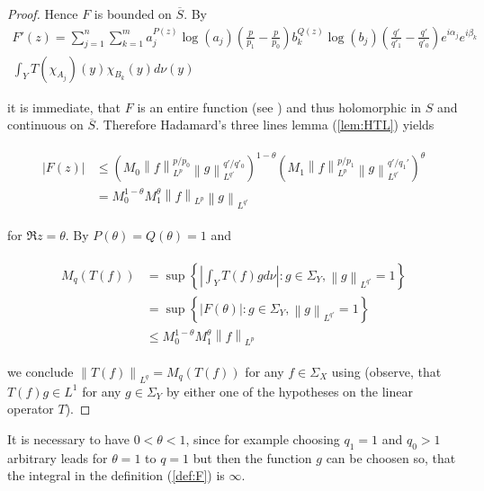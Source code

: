 \begin{proof}
	Hence $F$ is bounded on $\overline{S}$. By 
\begin{multline*}
	F'(z) = \sum_{j = 1}^n\sum_{k = 1}^m a^{P(z)}_j\log \left( a_j \right) \left( \frac{p}{p_1} - \frac{p}{p_0} \right) b_k^{Q(z)}\log\left( b_j \right)\left( \frac{q'}{q'_1} - \frac{q'}{q'_0} \right) e^{i\alpha_j} e^{i\beta_k} \\\int_YT(\chi_{A_j})(y)\chi_{B_k}(y)d\nu(y) 	
\end{multline*}

it is immediate, that $F$ is an entire function (see \cite[198]{rudin:rc_analysis:1987}) and thus holomorphic in $S$ and continuous on $\overline{S}$. Therefore Hadamard's three lines lemma (\ref{lem:HTL}) yields

\begin{gather}
	\begin{aligned}
		\left| F(z) \right| &\leqslant \left( M_0  \left\|f\right\|_{L^p}^{p/p_0} \left\|g\right\|_{L^{q'}}^{q'/q'_0} \right)^{1 - \theta}\left(  M_1 \left\|f\right\|_{L^p}^{p/p_1}\left\|g\right\|_{L^{q'}}^{q'/q_1'} \right)^\theta\\
			&= M_0^{1 - \theta}M_1^\theta \left\|f\right\|_{L^p}\left\|g\right\|_{L^{q'}}
		\label{est:F}
	\end{aligned}
\end{gather}

	for $\Re z = \theta$. By $P(\theta) = Q(\theta) = 1$ and

\begin{gather}
	\begin{aligned}
		M_q\left( T(f) \right) &= \sup\left\{\left| \int_Y T(f)gd\nu\right| : g \in \Sigma_Y, \left\|g\right\|_{L^{q'}} = 1\right\}\\
		&=  \sup\left\{\left| F(\theta)\right| : g \in \Sigma_Y, \left\|g\right\|_{L^{q'}} = 1\right\}\\
		&\leqslant M_0^{1 - \theta}M_1^\theta \left\|f\right\|_{L^p}
		\label{id:F}
	\end{aligned}
\end{gather}

	we conclude $\left\| T(f)\right\|_{L^q} = M_q\left( T(f) \right)$ for any $f \in \Sigma_X$ using \cite[189]{folland:real_analysis:1999} (observe, that $T(f)g \in L^1$ for any $g \in \Sigma_Y$ by either one of the hypotheses on the linear operator $T$).
\end{proof}

\begin{remark}
	It is necessary to have $0 < \theta < 1$, since for example choosing $q_1 = 1$ and $q_0 > 1$ arbitrary leads for $\theta = 1$ to $q = 1$ but then the function $g$ can be choosen so, that the integral in the definition \textup{(\ref{def:F})} is $\infty$.
\end{remark}


